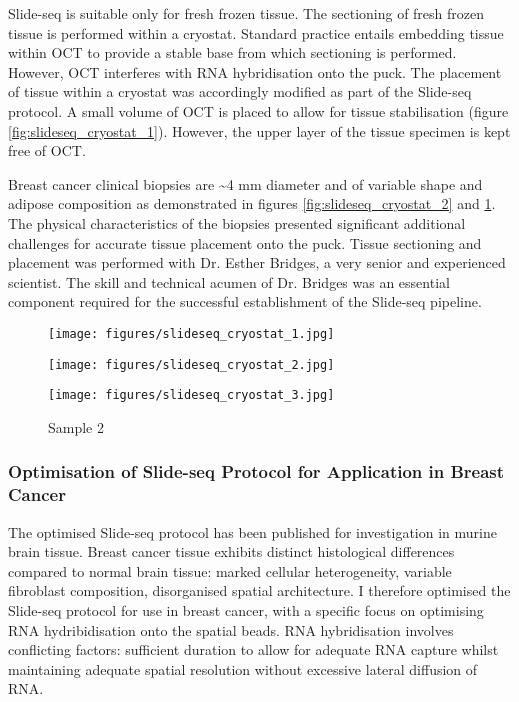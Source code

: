 Slide-seq is suitable only for fresh frozen tissue. The sectioning of fresh frozen tissue is performed within a cryostat. Standard practice entails embedding tissue within OCT to provide a stable base from which sectioning is performed. However, OCT interferes with RNA hybridisation onto the puck. The placement of tissue within a cryostat was accordingly modified as part of the Slide-seq protocol. A small volume of OCT is placed to allow for tissue stabilisation (figure \ref{fig:slideseq_cryostat_1}). However, the upper layer of the tissue specimen is kept free of OCT. 

Breast cancer clinical biopsies are \textasciitilde 4 mm diameter and of variable shape and adipose composition as demonstrated in figures \ref{fig:slideseq_cryostat_2} and \ref{fig:slideseq_cryostat_3}. The physical characteristics of the biopsies presented significant additional challenges for accurate tissue placement onto the puck. Tissue sectioning and placement was performed with Dr. Esther Bridges, a very senior and experienced scientist. The skill and technical acumen of Dr. Bridges was an essential component required for the successful establishment of the Slide-seq pipeline.


\begin{figure}[!htb]
	\centering
		\texttt{[image: figures/slideseq\_cryostat\_1.jpg]} \hfill
		\caption[Biopsy orientation for Slide-seq]{Biopsy \\ orientation in cryostat}
		\label{fig:slideseq_cryostat_1}
	\endminipage
		\centering
		\texttt{[image: figures/slideseq\_cryostat\_2.jpg]} \hfill
		\caption[Sample 1]{Sample 1}
		\label{fig:slideseq_cryostat_2}
	\endminipage\hfill
		\centering
		\texttt{[image: figures/slideseq\_cryostat\_3.jpg]} \hfill
		\caption[Sample 2]{Sample 2}
		\label{fig:slideseq_cryostat_3}
	\endminipage
\end{figure}



\subsubsection{Optimisation of Slide-seq Protocol for Application in Breast Cancer}
The optimised Slide-seq protocol has been published for investigation in murine brain tissue. Breast cancer tissue exhibits distinct histological differences compared to normal brain tissue: marked cellular heterogeneity, variable fibroblast composition, disorganised spatial architecture. I therefore optimised the Slide-seq protocol for use in breast cancer, with a specific focus on optimising RNA hydribidisation onto the spatial beads. RNA hybridisation involves conflicting factors: sufficient duration to allow for adequate RNA capture whilst maintaining adequate spatial resolution without excessive lateral diffusion of RNA.

